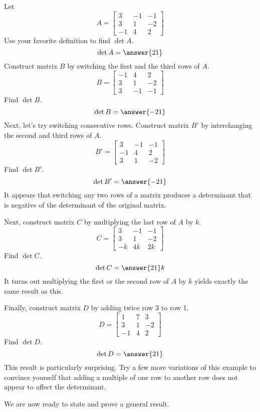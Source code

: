 \documentclass{ximera}
\begin{document}
\begin{exploration}\label{init:rowswap}
Let $$A=\begin{bmatrix}3&-1&-1\\3&1&-2\\-1&4&2\end{bmatrix}$$
Use your favorite definition to find $\det{A}$.
$$\det{A}=\answer{21}$$
Construct matrix $B$ by switching the first and the third rows of $A$.
$$B=\begin{bmatrix}-1&4&2\\3&1&-2\\3&-1&-1\end{bmatrix}$$
Find $\det{B}$.
$$\det{B}=\answer{-21}$$
Next, let's try switching consecutive rows.  Construct matrix $B'$ by interchanging the second and third rows of $A$.
$$B'=\begin{bmatrix}3&-1&-1\\-1&4&2\\3&1&-2\end{bmatrix}$$
Find $\det{B'}$.
$$\det{B'}=\answer{-21}$$
It appears that switching any two rows of a matrix produces a determinant that is negative of the determinant of the original matrix.

Next, construct matrix $C$ by multiplying the last row of $A$ by $k$.
$$C=\begin{bmatrix}3&-1&-1\\3&1&-2\\-k&4k&2k\end{bmatrix}$$
Find $\det{C}$.
$$\det{C}=\answer{21}k$$
It turns out multiplying the first or the second row of $A$ by $k$ yields exactly  the same result as this.

Finally, construct matrix $D$ by  adding twice row 3 to row 1.
$$D=\begin{bmatrix}1&7&3\\3&1&-2\\-1&4&2\end{bmatrix}$$
Find $\det{D}$.
$$\det{D}=\answer{21}$$
This result is particularly surprising.  Try a few more variations of this example to convince yourself that adding a multiple of one row to another row does not appear to affect the determinant.
\end{exploration}

We are now ready to state and prove a general result.
\end{document}
